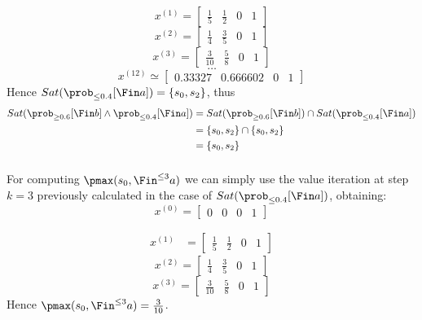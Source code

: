 \[
	x^{(1)} = \begin{bmatrix}
		\frac{1}{5} & \frac{1}{2} & 0 & 1
	\end{bmatrix}
\]
\[
	x^{(2)} = \begin{bmatrix}
		\frac{1}{4} & \frac{3}{5} & 0 & 1
	\end{bmatrix}
\]
\[
	x^{(3)} =
	\begin{bmatrix}
		\frac{3}{10} & \frac{5}{8} & 0 & 1
	\end{bmatrix}
\]
\[
	\dots
\]
\[
	x^{(12)} \simeq
	\begin{bmatrix}
		0.33327 & 0.666602 & 0 & 1
	\end{bmatrix}
\]
Hence $Sat(\prob_{\le 0.4} [\Fin a]) = \{ s_0, s_2 \}$, thus
\begin{align*}
	Sat(\prob_{\ge 0.6}  [\Fin b] \wedge \prob_{\le 0.4} [\Fin a]) & = Sat(\prob_{\ge 0.6} [\Fin b]) \cap Sat(\prob_{\le 0.4} [\Fin a]) \\
	                                                               & = \{ s_0, s_2 \} \cap \{ s_0, s_2 \}                               \\
	                                                               & = \{ s_0, s_2 \}
\end{align*}

\subsubsection{}

For computing $\pmax(s_0, \Fin^{\le 3} a)$ we can simply use the value
iteration at step $k = 3$ previously calculated in the case of
$Sat(\prob_{\le 0.4} [\Fin a])$, obtaining:
\[
	x^{(0)} = \begin{bmatrix} 0 & 0 & 0 & 1 \end{bmatrix}
\]

\begin{align*}
	x^{(1)} & = \begin{bmatrix}
		            \frac{1}{5} & \frac{1}{2} & 0 & 1
	            \end{bmatrix}
\end{align*}
\[
	x^{(2)} =
	\begin{bmatrix}
		\frac{1}{4} & \frac{3}{5} & 0 & 1
	\end{bmatrix}
\]
\[
	x^{(3)} =
	\begin{bmatrix}
		\frac{3}{10} & \frac{5}{8} & 0 & 1
	\end{bmatrix}
\]
Hence $\pmax(s_0, \Fin^{\le 3} a) = \frac{3}{10}$.

